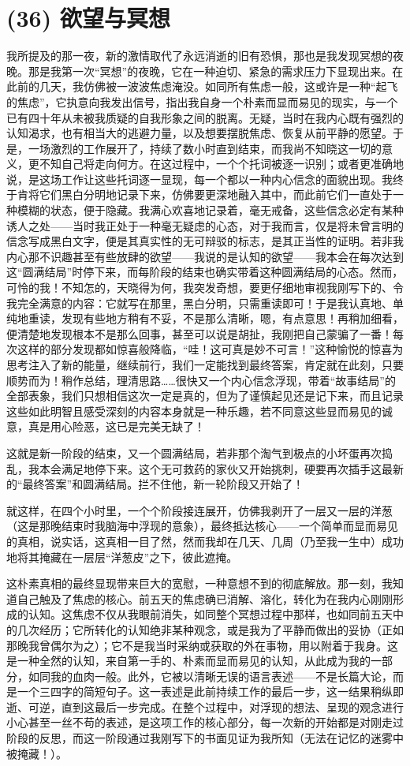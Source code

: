 \section{(36) 欲望与冥想}

我所提及的那一夜，新的激情取代了永远消逝的旧有恐惧，那也是我发现冥想的夜晚。那是我第一次“冥想”的夜晚，它在一种迫切、紧急的需求压力下显现出来。在此前的几天，我仿佛被一波波焦虑淹没。如同所有焦虑一般，这或许是一种“起飞的焦虑”，它执意向我发出信号，指出我自身一个朴素而显而易见的现实，与一个已有四十年从未被我质疑的自我形象之间的脱离。无疑，当时在我内心既有强烈的认知渴求，也有相当大的逃避力量，以及想要摆脱焦虑、恢复从前平静的愿望。于是，一场激烈的工作展开了，持续了数小时直到结束，而我尚不知晓这一切的意义，更不知自己将走向何方。在这过程中，一个个托词被逐一识别；或者更准确地说，是这场工作让这些托词逐一显现，每一个都以一种内心信念的面貌出现。我终于肯将它们黑白分明地记录下来，仿佛要更深地融入其中，而此前它们一直处于一种模糊的状态，便于隐藏。我满心欢喜地记录着，毫无戒备，这些信念必定有某种诱人之处——当时我正处于一种毫无疑虑的心态，对于我而言，仅是将未曾言明的信念写成黑白文字，便是其真实性的无可辩驳的标志，是其正当性的证明。若非我内心那不识趣甚至有些放肆的欲望——我说的是认知的欲望——我本会在每次达到这“圆满结局”时停下来，而每阶段的结束也确实带着这种圆满结局的心态。然而，可怜的我！不知怎的，天晓得为何，我突发奇想，要更仔细地审视我刚写下的、令我完全满意的内容：它就写在那里，黑白分明，只需重读即可！于是我认真地、单纯地重读，发现有些地方稍有不妥，不是那么清晰，嗯，有点意思！再稍加细看，便清楚地发现根本不是那么回事，甚至可以说是胡扯，我刚把自己蒙骗了一番！每次这样的部分发现都如惊喜般降临，“哇！这可真是妙不可言！”这种愉悦的惊喜为思考注入了新的能量，继续前行，我们一定能找到最终答案，肯定就在此刻，只要顺势而为！稍作总结，理清思路……很快又一个内心信念浮现，带着“故事结局”的全部表象，我们只想相信这次一定是真的，但为了谨慎起见还是记下来，而且记录这些如此明智且感受深刻的内容本身就是一种乐趣，若不同意这些显而易见的诚意，真是用心险恶，这已是完美无缺了！

这就是新一阶段的结束，又一个圆满结局，若非那个淘气到极点的小坏蛋再次捣乱，我本会满足地停下来。这个无可救药的家伙又开始挑刺，硬要再次插手这最新的“最终答案”和圆满结局。拦不住他，新一轮阶段又开始了！

就这样，在四个小时里，一个个阶段接连展开，仿佛我剥开了一层又一层的洋葱（这是那晚结束时我脑海中浮现的意象），最终抵达核心——一个简单而显而易见的真相，说实话，这真相一目了然，然而我却在几天、几周（乃至我一生中）成功地将其掩藏在一层层“洋葱皮”之下，彼此遮掩。

这朴素真相的最终显现带来巨大的宽慰，一种意想不到的彻底解放。那一刻，我知道自己触及了焦虑的核心。前五天的焦虑确已消解、溶化，转化为在我内心刚刚形成的认知。这焦虑不仅从我眼前消失，如同整个冥想过程中那样，也如同前五天中的几次经历；它所转化的认知绝非某种观念，或是我为了平静而做出的妥协（正如那晚我曾偶尔为之）；它不是我当时采纳或获取的外在事物，用以附着于我身。这是一种全然的认知，来自第一手的、朴素而显而易见的认知，从此成为我的一部分，如同我的血肉一般。此外，它被以清晰无误的语言表述——不是长篇大论，而是一个三四字的简短句子。这一表述是此前持续工作的最后一步，这一结果稍纵即逝、可逆，直到这最后一步完成。在整个过程中，对浮现的想法、呈现的观念进行小心甚至一丝不苟的表述，是这项工作的核心部分，每一次新的开始都是对刚走过阶段的反思，而这一阶段通过我刚写下的书面见证为我所知（无法在记忆的迷雾中被掩藏！）。

